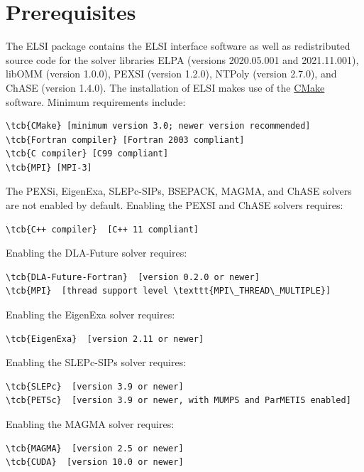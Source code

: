 \documentclass{report}
\newcommand{\tcb}[1]{\textcolor{blue}{#1}}
\begin{document}
\section{Prerequisites}
\label{sec:prereq} The ELSI package contains the ELSI interface software as
well as redistributed source code for the solver libraries ELPA (versions
2020.05.001 and 2021.11.001), libOMM (version 1.0.0), PEXSI
     (version 1.2.0), NTPoly (version 2.7.0), and ChASE (version 1.4.0).
     The installation of ELSI makes use of the
     \href{https://cmake.org}{CMake} software. Minimum requirements
     include:
\begin{Verbatim}[commandchars=\\\{\}]
\tcb{CMake} [minimum version 3.0; newer version recommended]
\tcb{Fortran compiler} [Fortran 2003 compliant]
\tcb{C compiler} [C99 compliant]
\tcb{MPI} [MPI-3]
\end{Verbatim}

The PEXSi, EigenExa, SLEPc-SIPs, BSEPACK, MAGMA, and ChASE solvers are not enabled by default. Enabling the PEXSI and ChASE solvers requires:
\begin{Verbatim}[commandchars=\\\{\}]
\tcb{C++ compiler}  [C++ 11 compliant]
\end{Verbatim}

Enabling the DLA-Future solver requires:
\begin{Verbatim}[commandchars=\\\{\}]
\tcb{DLA-Future-Fortran}  [version 0.2.0 or newer]
\tcb{MPI}  [thread support level \texttt{MPI\_THREAD\_MULTIPLE}]
\end{Verbatim}

Enabling the EigenExa solver requires:
\begin{Verbatim}[commandchars=\\\{\}]
\tcb{EigenExa}  [version 2.11 or newer]
\end{Verbatim}

Enabling the SLEPc-SIPs solver requires:
\begin{Verbatim}[commandchars=\\\{\}]
\tcb{SLEPc}  [version 3.9 or newer]
\tcb{PETSc}  [version 3.9 or newer, with MUMPS and ParMETIS enabled]
\end{Verbatim}

Enabling the MAGMA solver requires:
\begin{Verbatim}[commandchars=\\\{\}]
\tcb{MAGMA}  [version 2.5 or newer]
\tcb{CUDA}  [version 10.0 or newer]
\end{Verbatim}
\end{document}
